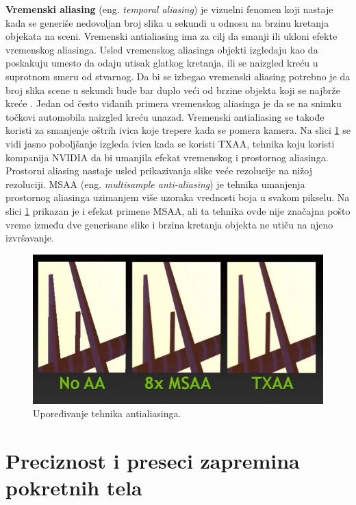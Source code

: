 \documentclass[12pt,oneside]{memoir}
\begin{document}
\textbf{Vremenski aliasing} (eng. {\em temporal aliasing}) je vizuelni fenomen koji 
nastaje kada se generiše nedovoljan broj slika u sekundi u odnosu na brzinu kretanja objekata na sceni.
Vremenski antialiasing ima za cilj da smanji ili ukloni efekte vremenskog aliasinga.
Usled vremenskog aliasinga objekti izgledaju kao da poskakuju umesto da odaju utisak glatkog kretanja,
ili se naizgled kreću u suprotnom smeru od stvarnog.
Da bi se izbegao vremenski aliasing potrebno je da broj slika scene u sekundi bude bar duplo veći 
od brzine objekta koji se najbrže kreće \cite{Grant}. 
Jedan od često viđanih primera vremenskog aliasinga je da se na snimku točkovi automobila naizgled kreću unazad.
Vremenski antialiasing se takođe koristi za smanjenje oštrih ivica koje trepere kada se pomera kamera.
Na slici \ref{fig:txaa} se vidi jasno poboljšanje izgleda ivica kada se koristi TXAA,
tehnika koju koristi kompanija NVIDIA da bi umanjila efekat vremenskog i prostornog aliasinga.
Prostorni aliasing nastaje usled prikazivanja slike veće rezolucije na nižoj rezoluciji.
MSAA (eng. {\em multisample anti-aliasing}) je tehnika umanjenja prostornog aliasinga 
uzimanjem više uzoraka vrednosti boja u svakom pikselu.
Na slici \ref{fig:txaa} prikazan je i efekat primene MSAA, ali ta tehnika ovde nije značajna 
pošto vreme između dve generisane slike i brzina kretanja objekta ne utiču na njeno izvršavanje.

\begin{figure}[h!]
	\begin{center}
	\includegraphics[scale=0.65]{txaa.png}
	\end{center}
	\caption{Upoređivanje tehnika antialiasinga.}
	\label{fig:txaa}
\end{figure}

\section{Preciznost i preseci zapremina pokretnih tela}
\end{document}
